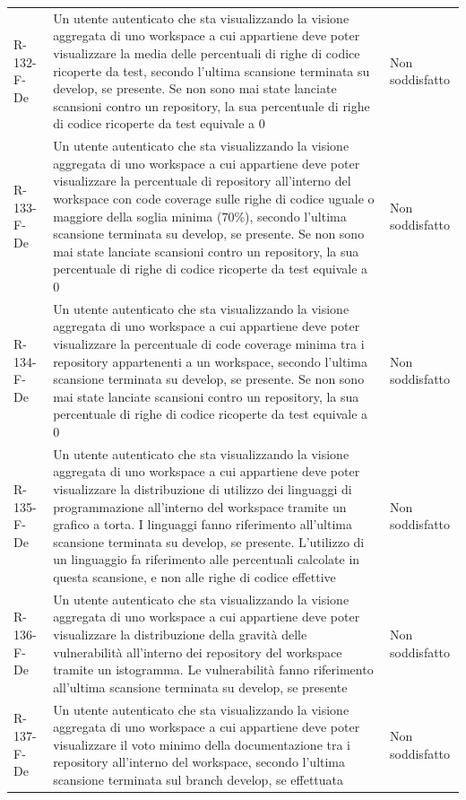 \documentclass[a4paper, 11pt]{article}
\begin{document}
\begin{longtable}[c]{ >{\centering\arraybackslash}m{2.5cm} >{\centering\arraybackslash}m{8.3cm} >{\centering\arraybackslash}m{3.5cm} }
R-132-F-De & Un utente autenticato che sta visualizzando la visione aggregata di uno workspace a cui appartiene deve poter visualizzare la media delle percentuali di righe di codice ricoperte da test, secondo l'ultima scansione terminata su develop, se presente. Se non sono mai state lanciate scansioni contro un repository, la sua percentuale di righe di codice ricoperte da test equivale a 0 & Non soddisfatto\\
R-133-F-De & Un utente autenticato che sta visualizzando la visione aggregata di uno workspace a cui appartiene deve poter visualizzare la percentuale di repository all'interno del workspace con code coverage sulle righe di codice uguale o maggiore della soglia minima (70\%), secondo l'ultima scansione terminata su develop, se presente. Se non sono mai state lanciate scansioni contro un repository, la sua percentuale di righe di codice ricoperte da test equivale a 0 & Non soddisfatto\\
R-134-F-De & Un utente autenticato che sta visualizzando la visione aggregata di uno workspace a cui appartiene deve poter visualizzare la percentuale di code coverage minima tra i repository appartenenti a un workspace, secondo l'ultima scansione terminata su develop, se presente. Se non sono mai state lanciate scansioni contro un repository, la sua percentuale di righe di codice ricoperte da test equivale a 0 & Non soddisfatto\\
R-135-F-De & Un utente autenticato che sta visualizzando la visione aggregata di uno workspace a cui appartiene deve poter visualizzare la distribuzione di utilizzo dei linguaggi di programmazione all'interno del workspace tramite un grafico a torta. I linguaggi fanno riferimento all'ultima scansione terminata su develop, se presente. L'utilizzo di un linguaggio fa riferimento alle percentuali calcolate in questa scansione, e non alle righe di codice effettive & Non soddisfatto\\
R-136-F-De & Un utente autenticato che sta visualizzando la visione aggregata di uno workspace a cui appartiene deve poter visualizzare la distribuzione della gravità delle vulnerabilità all'interno dei repository del workspace tramite un istogramma. Le vulnerabilità fanno riferimento all'ultima scansione terminata su develop, se presente & Non soddisfatto\\
R-137-F-De & Un utente autenticato che sta visualizzando la visione aggregata di uno workspace a cui appartiene deve poter visualizzare il voto minimo della documentazione tra i repository all'interno del workspace, secondo l'ultima scansione terminata sul branch develop, se effettuata & Non soddisfatto\\

\end{longtable}
\end{document}
